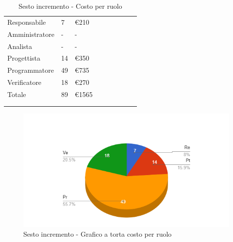 {{\begin{longtable}{C{.4\freewidth} C{.2\freewidth} C{.2\freewidth} C{.2\freewidth} C{.2\freewidth} C{.2\freewidth} C{.2\freewidth} C{.2\freewidth} C{.2\freewidth}}
        Responsabile  & 7 & €210\\
        Amministratore  & - & - \\
        Analista &- & -\\
        Progettista &14 &€350\\
        Programmatore &49 & €735\\
        Verificatore &18 &€270\\
        Totale&89&€1565\\
        \bottomrule
      \\
        \caption{Sesto incremento - Costo per ruolo}

        \end{longtable}
        \begin{figure}[H]
          \includegraphics[width=15cm]{sezioni/Images/sestoT.png}
          \centering
          \caption{Sesto incremento - Grafico a torta costo per ruolo}
       \end{figure}
    }
    }

